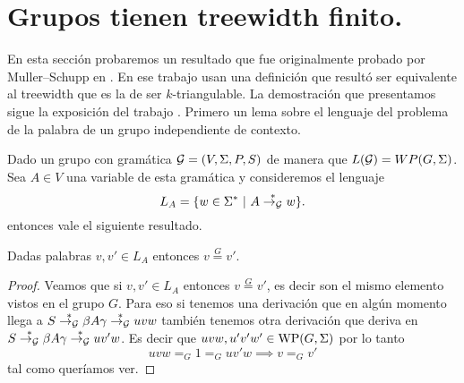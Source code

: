 \documentclass[tesis.tex]{subfiles}
\begin{document}
\section{Grupos \ic tienen treewidth finito.}\label{secc_MuSch}

En esta sección probaremos un resultado que fue originalmente probado por Muller--Schupp en \cite{muller1985theory}.
En ese trabajo usan una definición que resultó ser equivalente al treewidth que es la de ser $k$-triangulable.
La demostración que presentamos sigue la exposición del trabajo \cite{diekert2017context}.
Primero un lema sobre el lenguaje del problema de la palabra de un grupo independiente de contexto.


Dado un grupo \ic con gramática ${\cal G} = (V, \Sigma, P, S)$ de manera que $L({\cal G}) = WP(G,\Sigma)$.
Sea $A \in V$ una variable de esta gramática y consideremos el lenguaje
\[
	L_A = \{ w \in \Sigma^*  \ | \ A \overset{*}{\to_{\cal G}} w  \}.
\]
entonces vale el siguiente resultado.

\begin{lema}\label{palabras-wp}
	Dadas palabras $v,v' \in L_{A}$ entonces $v \overset{G}{=} v'$.
\end{lema}

\begin{proof}
	Veamos que si $v,v' \in L_A$ entonces $v \overset{G}{=} v'$, es decir son el mismo elemento vistos en el grupo $G$. 
	Para eso si tenemos una derivación que en algún momento llega a $S \overset{*}{\to_{\cal G}} \beta A \gamma \overset{*}{\to_{\cal G}} uvw$ también tenemos otra derivación que deriva en $S \overset{*}{\to_{\cal G}} \beta A \gamma  \overset{*}{\to_{\cal G}} uv'w$. 
	Es decir que $uvw, u'v'w' \in \text{WP}(G, \Sigma)$ por lo tanto 
	\begin{equation*}
		uvw =_G 1 =_G uv'w \implies v =_G v'
	\end{equation*}
	tal como queríamos ver.
\end{proof}
\end{document}
